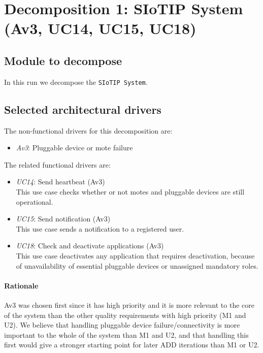 \section{Decomposition 1: SIoTIP System (Av3, UC14, UC15, UC18)}

\subsection{Module to decompose}
    In this run we decompose the \texttt{SIoTIP System}.


\subsection{Selected architectural drivers}
    The non-functional drivers for this decomposition are:
    \begin{itemize}
    	\item \emph{Av3}: Pluggable device or mote failure
    \end{itemize}

    \noindent The related functional drivers are:
    \begin{itemize}
    	\item \emph{UC14}: Send heartbeat (Av3) \\
              This use case checks whether or not motes and pluggable devices
              are still operational.
    	\item \emph{UC15}: Send notification (Av3) \\
              This use case sends a notification to a registered user.
    	\item \emph{UC18}: Check and deactivate applications (Av3) \\
              This use case deactivates any application that requires deactivation,
              because of unavailability of essential pluggable devices
              or unassigned mandatory roles.
    \end{itemize}

    \paragraph{Rationale}
        Av3 was chosen first since it has high priority and it is more relevant to
        the core of the system than the other quality requirements with high
        priority (M1 and U2).
        We believe that handling pluggable device failure/connectivity is
        more important to the whole of the system than M1 and U2, and that
        handling this first would give a stronger starting point for later ADD iterations
        than M1 or U2.


